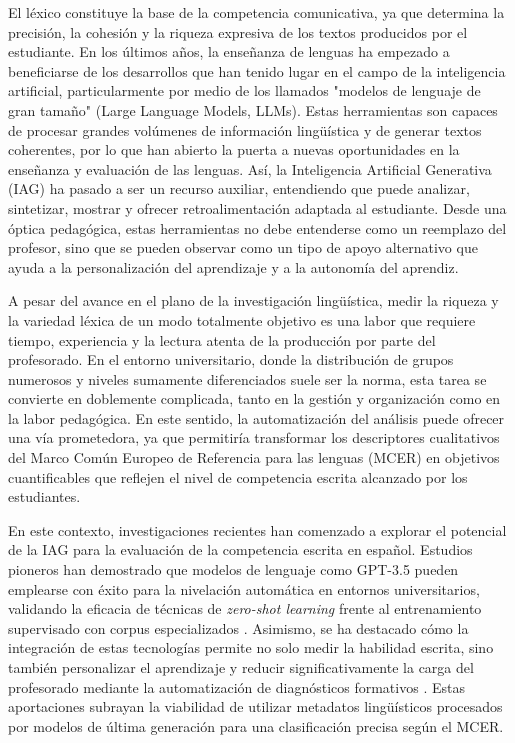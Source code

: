 \documentclass[spanish]{textolivre}
\begin{document}
El léxico constituye la base de la competencia comunicativa, ya que determina la precisión, la cohesión y la riqueza expresiva de los textos producidos por el estudiante. En los últimos años, la enseñanza de lenguas ha empezado a beneficiarse de los desarrollos que han tenido lugar en el campo de la inteligencia artificial, particularmente por medio de los llamados "modelos de lenguaje de gran tamaño" (Large Language Models, LLMs). Estas herramientas son capaces de procesar grandes volúmenes de información lingüística y de generar textos coherentes, por lo que han abierto la puerta a nuevas oportunidades en la enseñanza y evaluación de las lenguas. Así, la Inteligencia Artificial Generativa (IAG) ha pasado a ser un recurso auxiliar, entendiendo que puede analizar, sintetizar, mostrar y ofrecer retroalimentación adaptada al estudiante. Desde una óptica pedagógica, estas herramientas no debe entenderse como un reemplazo del profesor, sino que se pueden observar como un tipo de apoyo alternativo que ayuda a la personalización del aprendizaje y a la autonomía del aprendiz.

A pesar del avance en el plano de la investigación lingüística, medir la riqueza y la variedad léxica de un modo totalmente objetivo es una labor que requiere tiempo, experiencia y la lectura atenta de la producción por parte del profesorado. En el entorno universitario, donde la distribución de grupos numerosos y niveles sumamente diferenciados suele ser la norma, esta tarea se convierte en doblemente complicada, tanto en la gestión y organización como en la labor pedagógica. En este sentido, la automatización del análisis puede ofrecer una vía prometedora, ya que permitiría transformar los descriptores cualitativos del Marco Común Europeo de Referencia para las lenguas (MCER) en objetivos cuantificables que reflejen el nivel de competencia escrita alcanzado por los estudiantes.

En este contexto, investigaciones recientes han comenzado a explorar el potencial de la IAG para la evaluación de la competencia escrita en español. Estudios pioneros han demostrado que modelos de lenguaje como GPT-3.5 pueden emplearse con éxito para la nivelación automática en entornos universitarios, validando la eficacia de técnicas de \textit{zero-shot learning} frente al entrenamiento supervisado con corpus especializados \cite{cantero_romero2025}. Asimismo, se ha destacado cómo la integración de estas tecnologías permite no solo medir la habilidad escrita, sino también personalizar el aprendizaje y reducir significativamente la carga del profesorado mediante la automatización de diagnósticos formativos \cite{cantero_romero2026}. Estas aportaciones subrayan la viabilidad de utilizar metadatos lingüísticos procesados por modelos de última generación para una clasificación precisa según el MCER.
\end{document}
